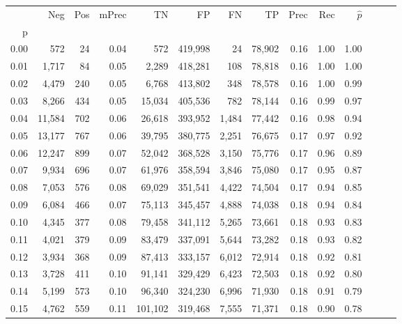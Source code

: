 \begin{tabular}{rrrrrrrrrrrrrr}
\toprule
{} &     Neg &    Pos & mPrec &       TN &       FP &      FN &      TP &  Prec &   Rec & $\hat{p}$ \\
p    &         &        &       &          &          &         &         &       &       &           \\
\midrule
0.00 &     572 &     24 &  0.04 &      572 &  419,998 &      24 &  78,902 &  0.16 &  1.00 &      1.00 \\
0.01 &   1,717 &     84 &  0.05 &    2,289 &  418,281 &     108 &  78,818 &  0.16 &  1.00 &      1.00 \\
0.02 &   4,479 &    240 &  0.05 &    6,768 &  413,802 &     348 &  78,578 &  0.16 &  1.00 &      0.99 \\
0.03 &   8,266 &    434 &  0.05 &   15,034 &  405,536 &     782 &  78,144 &  0.16 &  0.99 &      0.97 \\
0.04 &  11,584 &    702 &  0.06 &   26,618 &  393,952 &   1,484 &  77,442 &  0.16 &  0.98 &      0.94 \\
0.05 &  13,177 &    767 &  0.06 &   39,795 &  380,775 &   2,251 &  76,675 &  0.17 &  0.97 &      0.92 \\
0.06 &  12,247 &    899 &  0.07 &   52,042 &  368,528 &   3,150 &  75,776 &  0.17 &  0.96 &      0.89 \\
0.07 &   9,934 &    696 &  0.07 &   61,976 &  358,594 &   3,846 &  75,080 &  0.17 &  0.95 &      0.87 \\
0.08 &   7,053 &    576 &  0.08 &   69,029 &  351,541 &   4,422 &  74,504 &  0.17 &  0.94 &      0.85 \\
0.09 &   6,084 &    466 &  0.07 &   75,113 &  345,457 &   4,888 &  74,038 &  0.18 &  0.94 &      0.84 \\
0.10 &   4,345 &    377 &  0.08 &   79,458 &  341,112 &   5,265 &  73,661 &  0.18 &  0.93 &      0.83 \\
0.11 &   4,021 &    379 &  0.09 &   83,479 &  337,091 &   5,644 &  73,282 &  0.18 &  0.93 &      0.82 \\
0.12 &   3,934 &    368 &  0.09 &   87,413 &  333,157 &   6,012 &  72,914 &  0.18 &  0.92 &      0.81 \\
0.13 &   3,728 &    411 &  0.10 &   91,141 &  329,429 &   6,423 &  72,503 &  0.18 &  0.92 &      0.80 \\
0.14 &   5,199 &    573 &  0.10 &   96,340 &  324,230 &   6,996 &  71,930 &  0.18 &  0.91 &      0.79 \\
0.15 &   4,762 &    559 &  0.11 &  101,102 &  319,468 &   7,555 &  71,371 &  0.18 &  0.90 &      0.78 \\

\end{tabular}

